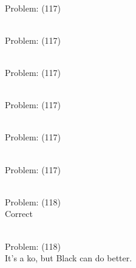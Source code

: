 \documentclass[11pt]{article}
\begin{document}
\begin{minipage}[t]{0.5\textwidth}
  {\centering
  
\\
Problem: (117)\\
  }
\end{minipage}
\begin{minipage}[t]{0.5\textwidth}
  {\centering
  
\\
Problem: (117)\\
  }
\end{minipage}
\begin{minipage}[t]{0.5\textwidth}
  {\centering
  
\\
Problem: (117)\\
  }
\end{minipage}
\begin{minipage}[t]{0.5\textwidth}
  {\centering
  
\\
Problem: (117)\\
  }
\end{minipage}
\begin{minipage}[t]{0.5\textwidth}
  {\centering
  
\\
Problem: (117)\\
  }
\end{minipage}
\begin{minipage}[t]{0.5\textwidth}
  {\centering
  
\\
Problem: (117)\\
  }
\end{minipage}
\begin{minipage}[t]{0.5\textwidth}
  {\centering
  
\\
Problem: (118)\\
Correct\\
  }
\end{minipage}
\begin{minipage}[t]{0.5\textwidth}
  {\centering
  
\\
Problem: (118)\\
It's a ko, but Black can do better.\\
  }
\end{minipage}
\end{document}
